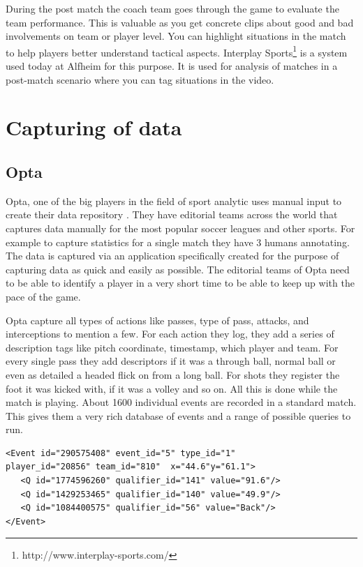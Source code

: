 During the post match the coach team goes through the game to evaluate the team performance. This is valuable as you get concrete clips about good and bad involvements on team or player level. You can highlight situations in the match to help players better understand tactical aspects. Interplay Sports\footnote{ http://www.interplay-sports.com/} is a system used today at Alfheim for this purpose. It is used for analysis of matches in a post-match scenario where you can tag situations in the video. 

\section{Capturing of data}
\subsection{Opta}

Opta, one of the big players in the field of sport analytic uses manual input to create their data repository \cite{dailymailOnStatistics}. They have editorial teams across the world that captures data manually for the most popular soccer leagues and other sports. For example to capture statistics for a single match they have 3 humans annotating. The data is captured via an application specifically created for the purpose of capturing data as quick and easily as possible. The editorial teams of Opta need to be able to identify a player in a very short time to be able to keep up with the pace of the game. 

Opta capture all types of actions like passes, type of pass, attacks, and interceptions to mention a few. For each action they log, they add a series of description tags like pitch coordinate, timestamp, which player and team. For every single pass they add descriptors if it was a through ball, normal ball or even as detailed a headed flick on from a long ball. For shots they register the foot it was kicked with, if it was a volley and so on. All this is done while the match is playing. About 1600 individual events are recorded in a standard match. This gives them a very rich database of events and a range of possible queries to run. 

\begin{lstlisting}
<Event id="290575408" event_id="5" type_id="1" 
player_id="20856" team_id="810"  x="44.6"y="61.1">
   <Q id="1774596260" qualifier_id="141" value="91.6"/>
   <Q id="1429253465" qualifier_id="140" value="49.9"/>
   <Q id="1084400575" qualifier_id="56" value="Back"/>
</Event>
\end{lstlisting}

